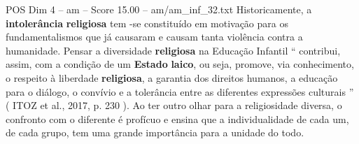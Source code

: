 \begin{textsample}{POS Dim 4 – am – Score 15.00 – am/am\_inf\_32.txt}
Historicamente, a \textbf{intolerância} \textbf{religiosa} tem -se constituído em motivação para os fundamentalismos que já causaram e causam tanta violência contra a humanidade.
Pensar a diversidade \textbf{religiosa} na Educação Infantil “ contribui, assim, com a condição de um \textbf{Estado} \textbf{laico}, ou seja, promove, via conhecimento, o respeito à liberdade \textbf{religiosa}, a garantia dos direitos humanos, a educação para o diálogo, o convívio e a tolerância entre as diferentes expressões culturais ” ( ITOZ et al., 2017, p. 230 ).
Ao ter outro olhar para a religiosidade diversa, o confronto com o diferente é profícuo e ensina que a individualidade de cada um, de cada grupo, tem uma grande importância para a unidade do todo.

\end{textsample}
